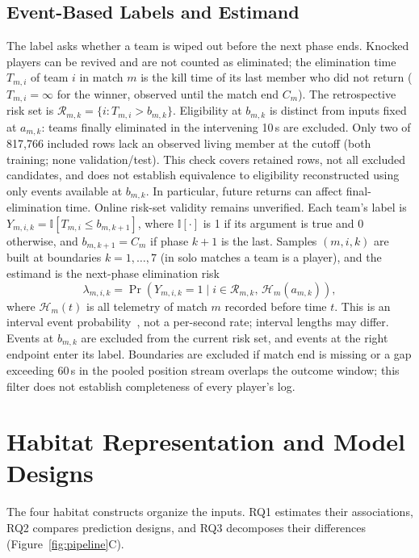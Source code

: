 \documentclass[sigconf,anonymous,nonacm]{acmart}
\begin{document}
\subsection{Event-Based Labels and Estimand}
The label asks whether a team is wiped out before the next phase ends.
Knocked players can be revived and are not counted as eliminated; the elimination time $T_{m,i}$ of team $i$ in match $m$ is the kill time of its last member who did not return ($T_{m,i}=\infty$ for the winner, observed until the match end $C_m$).
The retrospective risk set is $\mathcal{R}_{m,k}=\{i:T_{m,i}>b_{m,k}\}$. Eligibility at $b_{m,k}$ is distinct from inputs fixed at $a_{m,k}$: teams finally eliminated in the intervening 10\,s are excluded. Only two of 817,766 included rows lack an observed living member at the cutoff (both training; none validation/test). This check covers retained rows, not all excluded candidates, and does not establish equivalence to eligibility reconstructed using only events available at $b_{m,k}$. In particular, future returns can affect final-elimination time. Online risk-set validity remains unverified.
Each team's label is $Y_{m,i,k}=\mathbb{I}[T_{m,i}\le b_{m,k+1}]$, where $\mathbb{I}[\cdot]$ is 1 if its argument is true and 0 otherwise, and $b_{m,k+1}=C_m$ if phase $k+1$ is the last.
Samples $(m,i,k)$ are built at boundaries $k=1,\dots,7$ (in solo matches a team is a player), and the estimand is the next-phase elimination risk
\begin{equation}
\lambda_{m,i,k}=\Pr\!\left(Y_{m,i,k}=1 \mid i\in\mathcal{R}_{m,k},\,\mathcal{H}_{m}(a_{m,k})\right),
\label{eq:hazard}
\end{equation}
where $\mathcal{H}_{m}(t)$ is all telemetry of match $m$ recorded before time $t$.
This is an interval event probability~\cite{vanHouwelingen07}, not a per-second rate; interval lengths may differ. Events at $b_{m,k}$ are excluded from the current risk set, and events at the right endpoint enter its label. Boundaries are excluded if match end is missing or a gap exceeding 60\,s in the pooled position stream overlaps the outcome window; this filter does not establish completeness of every player's log.

\section{Habitat Representation and Model Designs}
\label{sec:method:design}
The four habitat constructs organize the inputs. RQ1 estimates their associations, RQ2 compares prediction designs, and RQ3 decomposes their differences (Figure~\ref{fig:pipeline}C).
\end{document}
